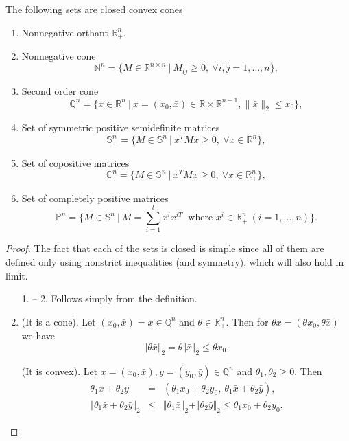 \documentclass[12pt]{book}
\theoremstyle{definition}
\begin{document}
\begin{appendix}
 The following sets are closed convex cones 
\label{ExClosedConvexCones}
\begin{enumerate}
\item Nonnegative orthant $\mathbb{R}^n_+$,
\item Nonnegative cone $$\mathbb{N}^n = \{M\in \mathbb{R}^{n\times n} \ \vert \ M_{ij} \geq 0, \ \forall i,j=1,\dots ,n\},$$
\item Second order cone $$\mathbb{Q}^n=\{x\in \mathbb{R}^n \ | \ x = (x_0,\bar{x}) \in \mathbb{R}\times\mathbb{R}^{n-1}, \|\bar{x}\|_2\leq x_0\},$$
\item Set of symmetric positive semidefinite matrices  $$\mathbb{S}^n_+ = \{M \in \mathbb{S}^n \ \vert \ x^TMx\geq 0, \  \forall x\in \mathbb{R}^n\},$$
\item Set of copositive matrices $$\mathbb{C}^n = \{M \in \mathbb{S}^n \ \vert \ x^TMx\geq 0, \  \forall x\in \mathbb{R}^n_+\},$$
\item Set of completely positive matrices $$\mathbb{P}^n = \{M\in \mathbb{S}^n \ | \ M = \sum_{i = 1}^l x^{i}x^{iT} \ \mbox{ where } x^i \in \mathbb{R}^n_+ \ (i = 1,\dots ,n) \}.$$
\end{enumerate} 

\begin{proof}%
The fact that each of the sets is closed is simple since all of them are defined only using nonstrict inequalities (and symmetry), which will also hold in limit. %
\begin{enumerate}
\item[1. -- 2.] Follows simply from the definition.
\setcounter{enumi}{2}
\item (It is a cone). Let $(x_0,\bar{x})= x\in \mathbb{Q}^n$ and $\theta \in \mathbb{R}^n_+$.
Then for $\theta x = (\theta x_0, \theta\bar{x})$ we have  
$$\Vert \theta\bar{x}\Vert_2 = \theta \Vert \bar{x}\Vert_2 \leq \theta x_0.$$

(It is convex). Let $x=(x_0,\bar{x}),y=(y_0,\bar{y})\in\mathbb{Q}^n$ and $\theta_1, \theta_2 \geq 0$.
Then 
\begin{eqnarray*}
\theta_1x + \theta_2y &=& (\theta_1x_0+\theta_2y_0,\  \theta_1\bar{x} + \theta_2\bar{y}),  \\
\Vert \theta_1\bar{x} + \theta_2\bar{y} \Vert_2 &\leq & \Vert \theta_1\bar{x} \Vert_2 + \Vert \theta_2\bar{y} \Vert_2 \leq  \theta_1x_0+\theta_2y_0.
\end{eqnarray*}


\end{enumerate}
\end{proof}
\end{appendix}
\end{document}
